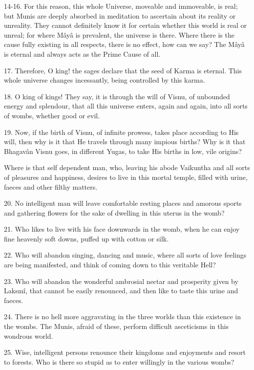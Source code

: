 14-16. For this reason, this whole Universe, moveable and immoveable, is real; but Munis are deeply absorbed in meditation to ascertain about its reality or unreality. They cannot definitely know it for certain whether this world is real or unreal; for where M\^ay\^a is prevalent, the universe is there. Where there is the cause fully existing in all respects, there is no effect, how can we say? The M\^ay\^a is eternal and always acts as the Prime Cause of all.

17. Therefore, O king! the sages declare that the seed of Karma is eternal. This whole universe changes incessantly, being controlled by this karma.

18. O king of kings! They say, it is through the will of Visnu, of unbounded energy and splendour, that all this universe enters, again and again, into all sorts of wombs, whether good or evil.

19. Now, if the birth of Visnu, of infinite prowess, takes place according to His will, then why is it that He travels through many impious births? Why is it that Bhagav\^an Visnu goes, in different Yugas, to take His births in low, vile origins?

Where is that self dependent man, who, leaving his abode Vaikuntha and all sorts of pleasures and happiness, desires to live in this mortal temple, filled with urine, faeces and other filthy matters.

20. No intelligent man will leave comfortable resting places and amorous sports and gathering flowers for the sake of dwelling in this uterus in the womb?

21. Who likes to live with his face downwards in the womb, when he can enjoy fine heavenly soft downs, puffed up with cotton or silk.

22. Who will abandon singing, dancing and music, where all sorts of love feelings are being manifested, and think of coming down to this veritable Hell?

23. Who will abandon the wonderful ambrosial nectar and prosperity given by Laksm\^i, that cannot be easily renounced, and then like to taste this urine and faeces.

24. There is no hell more aggravating in the three worlds than this existence in the wombs. The Munis, afraid of these, perform difficult asceticisms in this wondrous world.

25. Wise, intelligent persons renounce their kingdoms and enjoyments and resort to forests. Who is there so stupid as to enter willingly in the various wombs?

